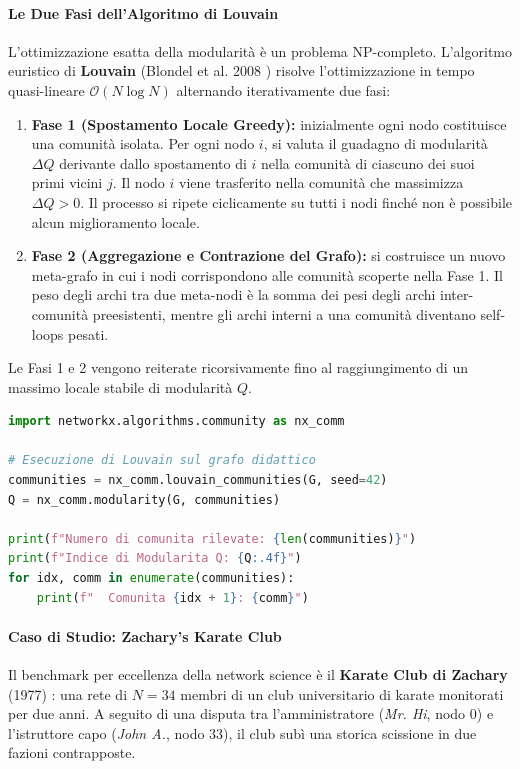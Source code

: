 \paragraph{Le Due Fasi dell'Algoritmo di Louvain}
L'ottimizzazione esatta della modularità è un problema NP-completo. L'algoritmo euristico di \textbf{Louvain} (Blondel et al. 2008 \cite{blondel2008}) risolve l'ottimizzazione in tempo quasi-lineare $\mathcal{O}(N \log N)$ alternando iterativamente due fasi:
\begin{enumerate}
    \item \textbf{Fase 1 (Spostamento Locale Greedy):} inizialmente ogni nodo costituisce una comunità isolata. Per ogni nodo $i$, si valuta il guadagno di modularità $\Delta Q$ derivante dallo spostamento di $i$ nella comunità di ciascuno dei suoi primi vicini $j$. Il nodo $i$ viene trasferito nella comunità che massimizza $\Delta Q > 0$. Il processo si ripete ciclicamente su tutti i nodi finché non è possibile alcun miglioramento locale.
    \item \textbf{Fase 2 (Aggregazione e Contrazione del Grafo):} si costruisce un nuovo meta-grafo in cui i nodi corrispondono alle comunità scoperte nella Fase 1. Il peso degli archi tra due meta-nodi è la somma dei pesi degli archi inter-comunità preesistenti, mentre gli archi interni a una comunità diventano self-loops pesati.
\end{enumerate}
Le Fasi 1 e 2 vengono reiterate ricorsivamente fino al raggiungimento di un massimo locale stabile di modularità $Q$.

\begin{lstlisting}[language=Python, caption={Community detection con Louvain e calcolo della modularità in NetworkX.}]
import networkx.algorithms.community as nx_comm

# Esecuzione di Louvain sul grafo didattico
communities = nx_comm.louvain_communities(G, seed=42)
Q = nx_comm.modularity(G, communities)

print(f"Numero di comunita rilevate: {len(communities)}")
print(f"Indice di Modularita Q: {Q:.4f}")
for idx, comm in enumerate(communities):
    print(f"  Comunita {idx + 1}: {comm}")
\end{lstlisting}

\paragraph{Caso di Studio: Zachary's Karate Club}
Il benchmark per eccellenza della network science è il \textbf{Karate Club di Zachary} (1977) \cite{zachary1977}: una rete di $N=34$ membri di un club universitario di karate monitorati per due anni. A seguito di una disputa tra l'amministratore (\textit{Mr. Hi}, nodo 0) e l'istruttore capo (\textit{John A.}, nodo 33), il club subì una storica scissione in due fazioni contrapposte.

